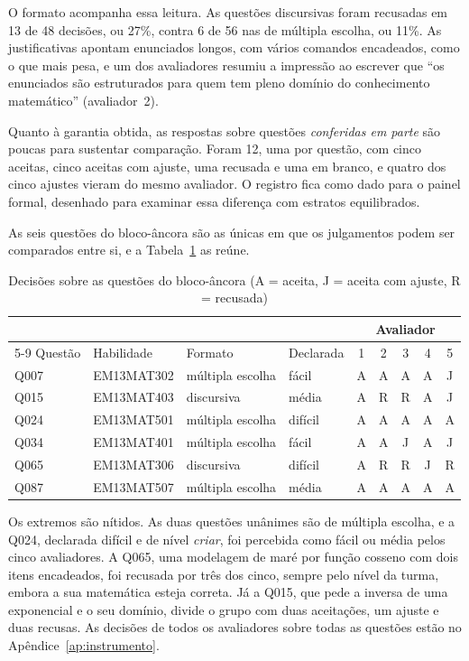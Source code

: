 O formato acompanha essa leitura. As questões discursivas foram recusadas em 13 de 48 decisões, ou
27\%, contra 6 de 56 nas de múltipla escolha, ou 11\%. As justificativas apontam enunciados longos,
com vários comandos encadeados, como o que mais pesa, e um dos avaliadores resumiu a impressão ao
escrever que ``os enunciados são estruturados para quem tem pleno domínio do conhecimento
matemático'' (avaliador~2).

Quanto à garantia obtida, as respostas sobre questões \emph{conferidas em parte} são poucas para
sustentar comparação. Foram 12, uma por questão, com cinco aceitas, cinco aceitas com ajuste, uma
recusada e uma em branco, e quatro dos cinco ajustes vieram do mesmo avaliador. O registro fica como
dado para o painel formal, desenhado para examinar essa diferença com estratos equilibrados.

\label{sub:rodada1-ancora}
As seis questões do bloco-âncora são as únicas em que os julgamentos podem ser comparados entre si,
e a Tabela~\ref{tab:rodada1-ancora} as reúne.

\begin{table}[htbp]
  \centering
  \caption{Decisões sobre as questões do bloco-âncora (A = aceita, J = aceita com ajuste,
  R = recusada)}
  \label{tab:rodada1-ancora}
  \begin{tabular}{llllccccc}
    \toprule
    & & & & \multicolumn{5}{c}{Avaliador} \\
    \cmidrule(l){5-9}
    Questão & Habilidade & Formato & Declarada & 1 & 2 & 3 & 4 & 5 \\
    \midrule
    Q007 & EM13MAT302 & múltipla escolha & fácil & A & A & A & A & J \\
    Q015 & EM13MAT403 & discursiva & média & A & R & R & A & J \\
    Q024 & EM13MAT501 & múltipla escolha & difícil & A & A & A & A & A \\
    Q034 & EM13MAT401 & múltipla escolha & fácil & A & A & J & A & J \\
    Q065 & EM13MAT306 & discursiva & difícil & A & R & R & J & R \\
    Q087 & EM13MAT507 & múltipla escolha & média & A & A & A & A & A \\
    \bottomrule
  \end{tabular}
\end{table}

Os extremos são nítidos. As duas questões unânimes são de múltipla escolha, e a Q024, declarada
difícil e de nível \emph{criar}, foi percebida como fácil ou média pelos cinco avaliadores. A Q065,
uma modelagem de maré por função cosseno com dois itens encadeados, foi recusada por três dos cinco,
sempre pelo nível da turma, embora a sua matemática esteja correta. Já a Q015, que pede a inversa de
uma exponencial e o seu domínio, divide o grupo com duas aceitações, um ajuste e duas recusas. As
decisões de todos os avaliadores sobre todas as questões estão no Apêndice~\ref{ap:instrumento}.

